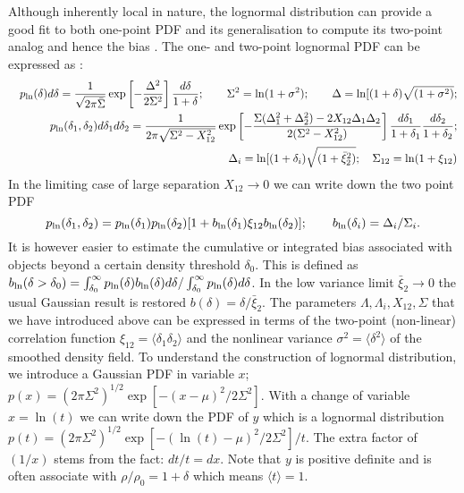 \documentclass[usenatbib]{mn2e}
\def\la{\langle}
\def\ra{\rangle}
\def\n{\noindent}
\def\be{\begin{equation}}
\def\ee{\end{equation}}
\def\be{\begin{equation}}
\def\ee{\end{equation}}
\begin{document}
 Although inherently local in nature, the lognormal distribution can provide a good fit to both  
one-point PDF and its generalisation to compute its two-point analog and hence the bias \citep{TTHF02}. 
The one- and two-point lognormal PDF can be expressed as \citep{KTS01}:
%
\begin{eqnarray}
&& p_{\rm ln}(\delta)d\delta = {1 \over \sqrt {2\pi \bar\Sigma}} \exp \left [ -{\Delta^2 \over 2\Sigma^2}\right ]{d\delta \over 1+\delta}; \quad\quad
\Sigma^2=\ln(1+\sigma^2); \quad\quad \Delta = \ln[(1+\delta)\sqrt{(1+\sigma^2)};\label{eq:logn1a} \\
&& p_{\rm ln}(\delta_1,\delta_2)d\delta_1 d\delta_2 =  {1 \over 2\pi \sqrt {\Sigma^2 - X_{12}^2}}\exp \left [ -{\Sigma(\Delta_1^2 + \Delta_2^2) -2X_{12}\Delta_1\Delta_2 \over 2(\Sigma^2 - X_{12}^2)}\right ] {d\delta_1\over 1+\delta_1} {d\delta_2\over 1+\delta_2}; \label{eq:logn2}\\
&& \Delta_i = \ln[(1+\delta_i)\sqrt{(1+\bar\xi_2^2)};  \quad \Sigma_{12}=\ln(1+\xi_{12})
\label{eq:logn2a}
\end{eqnarray}
%
\n
In the limiting case of large separation $X_{12}\rightarrow 0$ we can write down the two point PDF 
\be
p_{\rm ln}(\delta_1,\delta_2)= p_{\rm ln}(\delta_1)p_{\rm ln}(\delta_2)[1+ b_{\rm ln}(\delta_1)\xi_{12}b_{\rm ln}(\delta_2)]; \quad\quad  b_{\rm ln}(\delta_i)= \Delta_i/\Sigma_{i}.
\ee
\n
It is however easier to estimate the cumulative or integrated bias associated with objects beyond a certain density threshold $\delta_0$.
This is defined as $ b_{\rm ln}(\delta>\delta_0)=\int_{\delta_0}^{\infty} p_{\rm ln}(\delta) b_{\rm ln}(\delta) d\delta / \int_{\delta_0}^{\infty} p_{\rm ln}(\delta) d\delta$.
In the low variance limit ${\bar\xi}_2 \rightarrow 0$ the usual Gaussian result is 
restored $b(\delta)= \delta/{\bar\xi}_2$. The parameters $\Lambda,\Lambda_i, X_{12}, \Sigma$ that 
we have introduced above can be expressed in terms of the two-point (non-linear) correlation function 
$\xi_{12} = \la \delta_1\delta_2 \ra$ and the nonlinear variance $\sigma^2 = \la \delta^2 \ra$ of the smoothed density field.
To understand the construction of lognormal distribution, we introduce a Gaussian PDF in variable $x$;
$p(x) = (2 \pi \Sigma^2)^{1/2} \exp[-(x-\mu)^2/2\Sigma^2] $. With a change of variable $x = \ln(t)$ we can
write down the PDF of $y$ which is a lognormal distribution $p(t) = (2\pi\Sigma^2)^{1/2} \exp [-(\ln(t) -\mu)^2/2\Sigma^2]/t$.
The extra factor of $(1/x)$ stems from the fact: $dt/t = dx$. Note that $y$ is positive definite and 
is often associate with $\rho/\rho_0 = 1 +\delta$ which means $\la t \ra =1$. 
\end{document}
